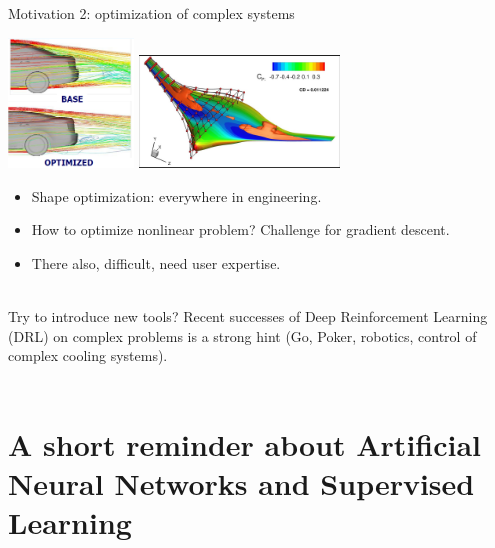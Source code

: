 \documentclass{beamer}
\begin{document}
\begin{frame}{Motivation 2: optimization of complex systems}
  \begin{center}
    \includegraphics[width=0.25\textwidth]{./Figures/shape_opt_aero}
      \hspace{0.5cm}
    \includegraphics[width=0.40\textwidth]{./Figures/opt_shape_flying_wing}
  \end{center}

    \begin{itemize}
      \item Shape optimization: everywhere in engineering.
      \item How to optimize nonlinear problem? Challenge for gradient descent.
      \item There also, difficult, need user expertise. \\~\\
    \end{itemize}

    Try to introduce new tools? Recent successes of Deep Reinforcement Learning (DRL) on complex problems is a strong hint (Go, Poker, robotics, control of complex cooling systems). ~\\~
\end{frame}








\section{A short reminder about Artificial Neural Networks and Supervised Learning}
\end{document}
